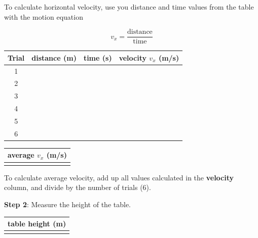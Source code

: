 \documentclass[../main-physics-workbook.tex]{subfiles}
\begin{document}
\noindent To calculate horizontal velocity, use you distance and time values from the table with the motion equation

\begin{equation*}
    v_x = \frac{\text{distance}}{\text{time}}
\end{equation*}

\bigskip

\begin{minipage}{0.6\textwidth}
\begin{center}
\def\arraystretch{1.5}
    \begin{tabular}{|c|c|c|c|}
        \hline
        \textbf{Trial} & \textbf{distance} (m) & \textbf{time} (s) & \textbf{velocity} $v_x$ (m/s)\\ \hline
        1 & & & \\ \hline
        2 & & & \\ \hline
        3 & & & \\ \hline
        4 & & & \\ \hline
        5 & & & \\ \hline
        6 & & & \\ \hline
    \end{tabular}
\end{center}
\end{minipage}%
\begin{minipage}{0.35\textwidth}
    \begin{center}
\def\arraystretch{1.5}
        \begin{tabular}{|c|}
            \hline
             \textbf{average} $v_x$ (m/s)\\
             \hline \\[1em]
             \hline
        \end{tabular}
    \end{center}    
\end{minipage}

\bigskip

\noindent To calculate average velocity, add up all values calculated in the \textbf{velocity} column, and divide by the number of trials (6).


\clearpage

\noindent \textbf{Step 2}: Measure the height of the table.

\begin{center}
    \begin{tabular}{|c|}
        \hline
         \textbf{table height} (m)\\
         \hline \\[1em]
         \hline
    \end{tabular}
\end{center}
\end{document}
